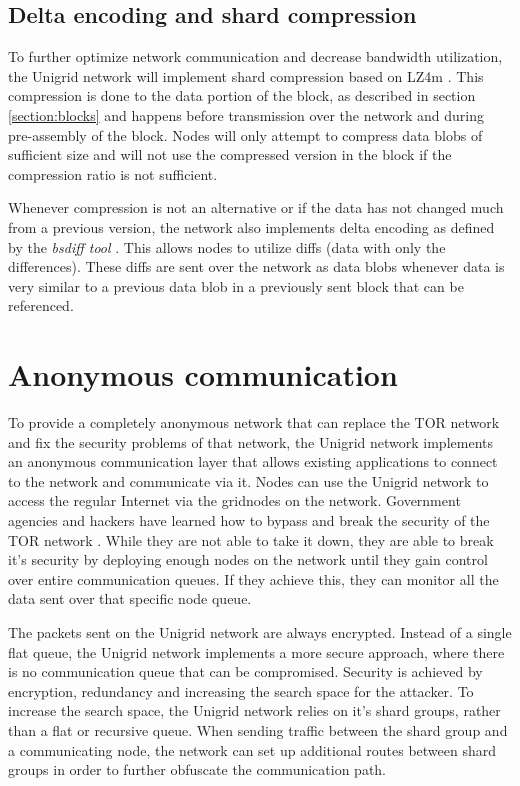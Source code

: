\documentclass[10pt,a4paper,final]{article}
\begin{document}
\subsection{Delta encoding and shard compression}
\label{section:delta}
To further optimize network communication and decrease bandwidth utilization, the Unigrid network will implement shard compression based on LZ4m \cite{lz42017}. This compression is done to the data portion of the block, as described in section \ref{section:blocks} and happens before transmission over the network and during pre-assembly of the block. Nodes will only attempt to compress data blobs of sufficient size and will not use the compressed version in the block if the compression ratio is not sufficient.

Whenever compression is not an alternative or if the data has not changed much from a previous version, the network also implements delta encoding as defined by the \emph{bsdiff tool} \cite{percival2006}. This allows nodes to utilize diffs (data with only the differences). These diffs are sent over the network as data blobs whenever data is very similar to a previous data blob in a previously sent block that can be referenced.

\section{Anonymous communication}
To provide a completely anonymous network that can replace the TOR network and fix the security problems of that network, the Unigrid network implements an anonymous communication layer that allows existing applications to connect to the network and communicate via it. Nodes can use the Unigrid network to access the regular Internet via the \glspl{gridnode} on the network. Government agencies and hackers have learned how to bypass and break the security of the TOR network \cite{guardian2013}. While they are not able to take it down, they are able to break it's security by deploying enough nodes on the network until they gain control over entire communication queues. If they achieve this, they can monitor all the data sent over that specific node queue.

The packets sent on the Unigrid network are always encrypted. Instead of a single flat queue, the Unigrid network implements a more secure approach, where there is no communication queue that can be compromised. Security is achieved by encryption, redundancy and increasing the search space for the attacker. To increase the search space, the Unigrid network relies on it's shard groups, rather than a flat or recursive queue. When sending traffic between the shard group and a communicating node, the network can set up additional routes between shard groups in order to further obfuscate the communication path.
\end{document}
